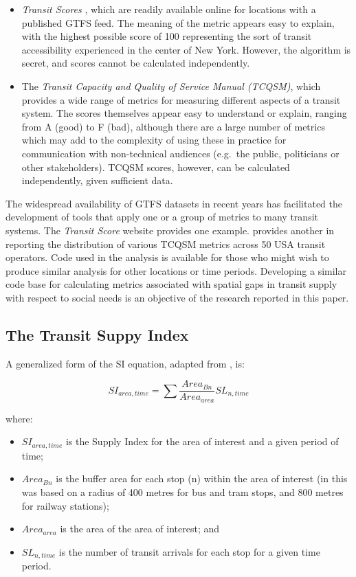\documentclass[preprint, 3p,
authoryear]{elsarticle} %
\begin{document}
\begin{itemize}
\item
  \emph{Transit Scores} \citep{WalkScore:2023tg}, which are readily
  available online for locations with a published GTFS feed. The meaning
  of the metric appears easy to explain, with the highest possible score
  of 100 representing the sort of transit accessibility experienced in
  the center of New York. However, the algorithm is secret, and scores
  cannot be calculated independently.
\item
  The \emph{Transit Capacity and Quality of Service Manual (TCQSM)},
  which provides a wide range of metrics for measuring different aspects
  of a transit system. The scores themselves appear easy to understand
  or explain, ranging from A (good) to F (bad), although there are a
  large number of metrics which may add to the complexity of using these
  in practice for communication with non-technical audiences (e.g.~the
  public, politicians or other stakeholders). TCQSM scores, however, can
  be calculated independently, given sufficient data.
\end{itemize}

The widespread availability of GTFS datasets in recent years has
facilitated the development of tools that apply one or a group of
metrics to many transit systems. The \emph{Transit Score} website
provides one example. \citet{Wong:2013aa} provides another in reporting
the distribution of various TCQSM metrics across 50 USA transit
operators. Code used in the \citet{Wong:2013aa} analysis is available
for those who might wish to produce similar analysis for other locations
or time periods. Developing a similar code base for calculating metrics
associated with spatial gaps in transit supply with respect to social
needs is an objective of the research reported in this paper.

\subsection{The Transit Suppy Index}\label{the-transit-suppy-index}

A generalized form of the SI equation, adapted from
\citet{currie2010identifying}, is:

\[SI_{area, time} = \sum{\frac{Area_{Bn}}{Area_{area}}SL_{n, time}}\]

where:

\begin{itemize}
\item
  \(SI_{area, time}\) is the Supply Index for the area of interest and a
  given period of time;
\item
  \(Area_{Bn}\) is the buffer area for each stop (n) within the area of
  interest (in \citet{currie2010identifying} this was based on a radius
  of 400 metres for bus and tram stops, and 800 metres for railway
  stations);
\item
  \(Area_{area}\) is the area of the area of interest; and
\item
  \(SL_{n,time}\) is the number of transit arrivals for each stop for a
  given time period.
\end{itemize}
\end{document}
